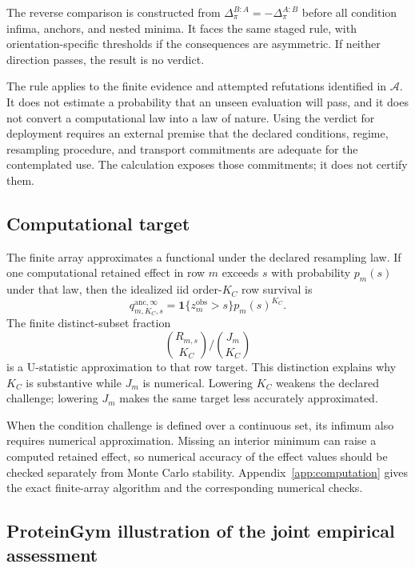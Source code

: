 \documentclass[11pt]{article}
\newcommand{\Assess}{\mathcal{A}}
\theoremstyle{remark}
\begin{document}
The reverse comparison is constructed from
$\Delta^{B:A}_\pi=-\Delta^{A:B}_\pi$ before all condition infima, anchors,
and nested minima. It faces the same staged rule, with orientation-specific
thresholds if the consequences are asymmetric. If neither direction passes,
the result is no verdict.

The rule applies to the finite evidence and attempted refutations identified
in $\Assess$. It does not estimate a probability that an unseen
evaluation will pass, and it does not convert a computational law into a law of
nature. Using the verdict for deployment requires an external premise that the
declared conditions, regime, resampling procedure, and transport commitments
are adequate for the contemplated use. The calculation exposes those
commitments; it does not certify them.

\subsection{Computational target}

The finite array approximates a functional under the declared resampling law.
If one computational retained effect in row $m$ exceeds $s$ with probability
$p_m(s)$ under that law, then the idealized iid order-$K_C$ row survival is
\begin{equation}
q^{\mathrm{anc},\infty}_{m,K_C,s}
=
\mathbf 1\{z_m^{\mathrm{obs}}>s\}p_m(s)^{K_C}.
\label{eq:ideal-row-survival}
\end{equation}
The finite distinct-subset fraction
\[
\binom{R_{m,s}}{K_C}/\binom{J_m}{K_C}
\]
is a U-statistic approximation to that row target. This distinction explains
why $K_C$ is substantive while $J_m$ is numerical. Lowering $K_C$ weakens the
declared challenge; lowering $J_m$ makes the same target less accurately
approximated.

When the condition challenge is defined over a continuous set, its infimum
also requires numerical approximation. Missing an interior minimum can raise a
computed retained effect, so numerical accuracy of the effect values should be
checked separately from Monte Carlo stability. Appendix~\ref{app:computation}
gives the exact finite-array algorithm and the corresponding numerical checks.

\subsection{ProteinGym illustration of the joint empirical assessment}
\label{sec:proteingym-illustration}
\end{document}
